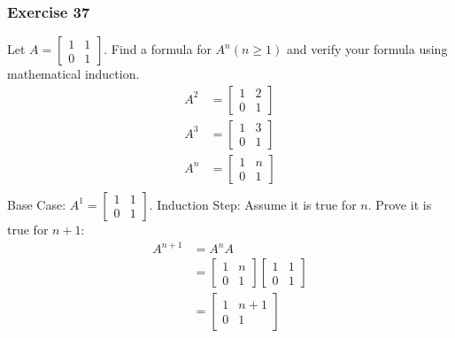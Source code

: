 \documentclass[letterpaper, 12pt]{math}
\begin{document}
\subsubsection*{Exercise 37}
Let \( A = \begin{bmatrix}1 & 1 \\ 0 & 1\end{bmatrix} \). Find a formula for
\( A^n(n\ge1) \) and verify your formula using mathematical induction.
\begin{align*}
  A^2 &= \begin{bmatrix}
    1 & 2 \\
    0 & 1
  \end{bmatrix} \\
  A^3 &= \begin{bmatrix}
    1 & 3 \\
    0 & 1
  \end{bmatrix} \\
  A^n &= \begin{bmatrix}
    1 & n \\
    0 & 1
  \end{bmatrix} \\
\end{align*}
Base Case: \( A^1 = \begin{bmatrix}1 & 1 \\ 0 & 1\end{bmatrix} \).
Induction Step: Assume it is true for \( n \). Prove it is true for \( n+1 \):
\begin{align*}
  A^{n+1} &= A^nA \\
  &= \begin{bmatrix}
    1 & n \\
    0 & 1
  \end{bmatrix}\begin{bmatrix}
    1 & 1 \\
    0 & 1
  \end{bmatrix} \\
  &= \begin{bmatrix}
    1 & n+1 \\
    0 & 1
  \end{bmatrix}
\end{align*}
\end{document}
